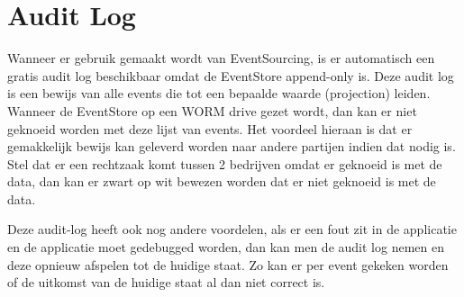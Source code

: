 
\section{Audit Log}
\label{sec:audit-log}

Wanneer er gebruik gemaakt wordt van EventSourcing, is er automatisch een gratis audit log beschikbaar omdat de EventStore append-only is. Deze audit log is een bewijs van alle events die tot een bepaalde waarde (projection) leiden. Wanneer de EventStore op een \gls{WORM} drive gezet wordt, dan kan er niet geknoeid worden met deze lijst van events. Het voordeel hieraan is dat er gemakkelijk bewijs kan geleverd worden naar andere partijen indien dat nodig is. Stel dat er een rechtzaak komt tussen 2 bedrijven omdat er geknoeid is met de data, dan kan er zwart op wit bewezen worden dat er niet geknoeid is met de data.

Deze audit-log heeft ook nog andere voordelen, als er een fout zit in de applicatie en de applicatie moet gedebugged worden, dan kan men de audit log nemen en deze opnieuw afspelen tot de huidige staat. Zo kan er per event gekeken worden of de uitkomst van de huidige staat al dan niet correct is.